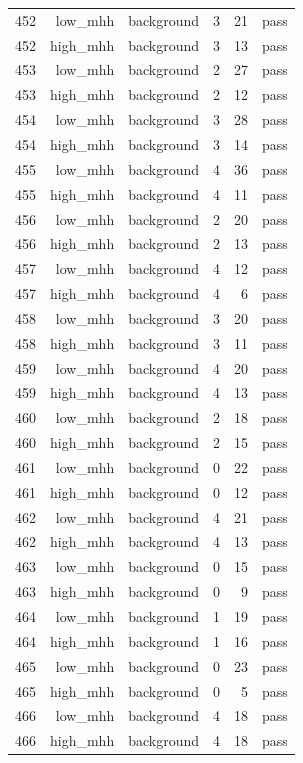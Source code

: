 \begin{table}[htbp]
{\begin{tabular}{lrrrrr}
452 & low\_mhh & background & 3 & 21 & pass \\
452 & high\_mhh & background & 3 & 13 & pass \\
453 & low\_mhh & background & 2 & 27 & pass \\
453 & high\_mhh & background & 2 & 12 & pass \\
454 & low\_mhh & background & 3 & 28 & pass \\
454 & high\_mhh & background & 3 & 14 & pass \\
455 & low\_mhh & background & 4 & 36 & pass \\
455 & high\_mhh & background & 4 & 11 & pass \\
456 & low\_mhh & background & 2 & 20 & pass \\
456 & high\_mhh & background & 2 & 13 & pass \\
457 & low\_mhh & background & 4 & 12 & pass \\
457 & high\_mhh & background & 4 & 6 & pass \\
458 & low\_mhh & background & 3 & 20 & pass \\
458 & high\_mhh & background & 3 & 11 & pass \\
459 & low\_mhh & background & 4 & 20 & pass \\
459 & high\_mhh & background & 4 & 13 & pass \\
460 & low\_mhh & background & 2 & 18 & pass \\
460 & high\_mhh & background & 2 & 15 & pass \\
461 & low\_mhh & background & 0 & 22 & pass \\
461 & high\_mhh & background & 0 & 12 & pass \\
462 & low\_mhh & background & 4 & 21 & pass \\
462 & high\_mhh & background & 4 & 13 & pass \\
463 & low\_mhh & background & 0 & 15 & pass \\
463 & high\_mhh & background & 0 & 9 & pass \\
464 & low\_mhh & background & 1 & 19 & pass \\
464 & high\_mhh & background & 1 & 16 & pass \\
465 & low\_mhh & background & 0 & 23 & pass \\
465 & high\_mhh & background & 0 & 5 & pass \\
466 & low\_mhh & background & 4 & 18 & pass \\
466 & high\_mhh & background & 4 & 18 & pass \\

\end{tabular}}
\end{table}

